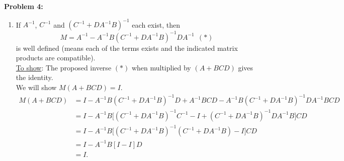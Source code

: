 \documentclass[letterpaper]{article}
\begin{document}
\noindent \textbf{Problem  4:}
\begin{enumerate}
\setlength{\itemsep}{.1in}
\renewcommand{\labelenumi}{(\alph{enumi})}
\item If $A^{-1}$, $C^{-1}$ and $(C^{-1}+DA^{-1}B)^{-1}$ each exist, then
$$M = A^{-1}-A^{-1}B(C^{-1} + DA^{-1}B)^{-1}DA^{-1}~~(*)$$
is well defined (means each of the terms exists and the indicated matrix products are compatible).
\medskip \\
\underline{To show}: The proposed inverse $(*)$ when multiplied by $(A+BCD)$ gives the identity.
\smallskip \\
We will show $M(A+BCD)=I$.
$$\begin{aligned}M(A+BCD) &= I - A^{-1}B(C^{-1} + DA^{-1}B)^{-1}D + A^{-1}BCD - A^{-1}B(C^{-1}+DA^{-1}B)^{-1}DA^{-1}BCD
\\ &= I - A^{-1}B \big[ (C^{-1}+DA^{-1}B)^{-1}C^{-1}-I+(C^{-1}+DA^{-1}B)^{-1}DA^{-1}B \big] CD
\\ &= I - A^{-1}B \big[ (C^{-1}+DA^{-1}B)^{-1}(C^{-1}+DA^{-1}B)-I \big]CD
\\ &= I - A^{-1}B [I-I] D
\\ &= I. \end{aligned}$$


\end{enumerate}
\end{document}
